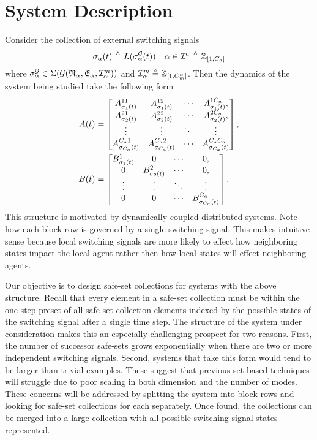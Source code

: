 \section{System Description}
Consider the collection of external switching signals 
$$\ss_\agentidx(t)\triangleq L(\ssg_\agentidx(t))\quad \agentidx\in\agentidxset\triangleq\int\rii{1}{\numagents}$$
where $\ssg_\agentidx\in\Sigma(\mathcal{G}(\mathfrak{N}_\agentidx,\mathfrak{E}_\agentidx, \modeidxset[\agentidx]))$ and $\modeidxset[\agentidx]\triangleq\int\rii{1}{\nummodes[\agentidx]}$.
Then the dynamics of the system being studied take the following form
\begin{align}
A(t)&=\begin{bmatrix}
A^{11}_{{\sigma}_1(t)}&A^{12}_{{\sigma}_1(t)}&\cdots&A^{1{C_a}}_{{\sigma}_1(t)},\\
A^{21}_{{\sigma}_2(t)}&A^{22}_{{\sigma}_2(t)}&\cdots&A^{2{C_a}}_{{\sigma}_2(t)},\\
\vdots&\vdots & \ddots & \vdots\\
A^{{C_a} 1}_{{\sigma}_{{C_a}}(t)} & A^{{C_a} 2}_{{\sigma}_{{C_a}}(t)} &\cdots & A^{{C_a} {C_a}}_{{\sigma}_{{C_a}}(t)} 
\end{bmatrix},\\
B(t)&=\begin{bmatrix}
B^{1}_{{\sigma}_1(t)}&0&\cdots&0,\\
0&B^{2}_{{\sigma}_2(t)}&\cdots&0,\\
\vdots&\vdots & \ddots & \vdots\\
0 & 0 &\cdots & B^{{C_a}}_{{\sigma}_{{C_a}}(t)} 
\end{bmatrix}.
\end{align}
This structure is motivated by dynamically coupled distributed systems. Note how each block-row is governed by a single switching signal. This makes intuitive sense because local switching signals are more likely to effect how neighboring states impact the local agent rather then how local states will effect neighboring agents.

Our objective is to design safe-set collections for systems with the above structure. Recall that every element in a safe-set collection must be within the one-step preset of all safe-set collection elements indexed by the possible states of the switching signal after a single time step. The structure of the system under consideration makes this an especially challenging prospect for two reasons. First, the number of successor safe-sets grows exponentially when there are two or more independent switching signals. Second, systems that take this form would tend to be larger than trivial examples. These suggest that previous set based techniques will struggle due to poor scaling in both dimension and the number of modes. These concerns will be addressed by splitting the system into block-rows and looking for safe-set collections for each separately. Once found, the collections can be merged into a large collection with all possible switching signal states represented.

